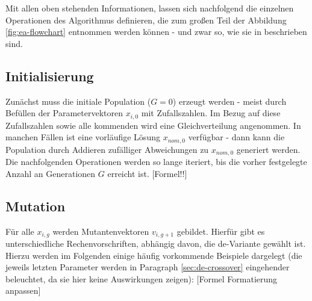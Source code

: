 		Mit allen oben stehenden Informationen, lassen sich nachfolgend die 
		einzelnen Operationen des Algorithmus definieren, die zum großen 
		Teil der Abbildung \ref{fig:ea-flowchart} entnommen werden können - und 
		zwar so, wie sie in \cite{storn-price-de, storn-price-de-book} 
		beschrieben sind.
		
		\subsection{Initialisierung}
		\label{sec:de-init}
		
			Zunächst muss die initiale Population ($G = 0$) erzeugt werden - 
			meist durch Befüllen der Parametervektoren $x_{i, 0}$ mit 
			Zufallszahlen. Im Bezug auf diese Zufallszahlen sowie alle 
			kommenden wird eine Gleichverteilung angenommen. In manchen Fällen 
			ist eine vorläufige Lösung $x_{nom, 0}$ verfügbar - dann kann die 
			Population durch Addieren zufälliger Abweichungen zu $x_{nom, 0}$ 
			generiert werden. Die nachfolgenden Operationen werden so lange 
			iteriert, bis die vorher festgelegte Anzahl an Generationen $G$ 
			erreicht ist. \color{red} [Formel!!] \color{black}
			
		\subsection{Mutation}
		\label{sec:de-mutation}
		
			Für alle $x_{i, g}$ werden Mutantenvektoren $v_{i, g+1}$ gebildet. 
			Hierfür gibt es unterschiedliche Rechenvorschriften, abhängig 
			davon, die \gls{de}-Variante gewählt ist. Hierzu werden im 
			Folgenden einige häufig vorkommende Beispiele dargelegt (die 
			jeweils letzten Parameter werden in Paragraph 
			\ref{sec:de-crossover} eingehender beleuchtet, da sie hier keine 
			Auswirkungen zeigen):
			\color{red} [Formel Formatierung anpassen] \color{black}
			
